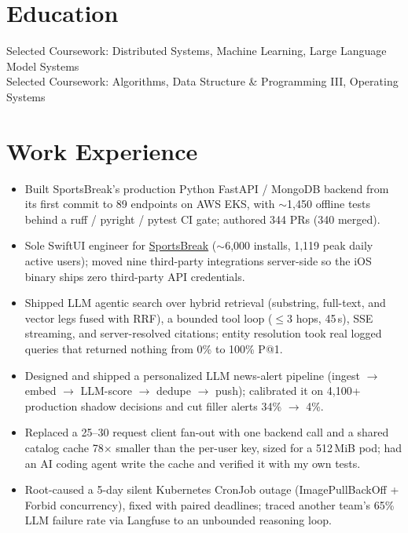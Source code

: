 \documentclass[11pt, letterpaper]{article}
\begin{document}

\section{Education}
Selected Coursework: Distributed Systems, Machine Learning, Large Language Model Systems\\[1pt]
Selected Coursework: Algorithms, Data Structure \& Programming III, Operating Systems

\section{Work Experience}
\begin{itemize}
  \item Built SportsBreak's production Python FastAPI / MongoDB backend from its first commit to 89 endpoints on AWS EKS, with $\sim$1{,}450 offline tests behind a ruff / pyright / pytest CI gate; authored 344 PRs (340 merged).
  \item Sole SwiftUI engineer for \href{https://apps.apple.com/app/id6762649287}{SportsBreak} ($\sim$6{,}000 installs, 1{,}119 peak daily active users); moved nine third-party integrations server-side so the iOS binary ships zero third-party API credentials.
  \item Shipped LLM agentic search over hybrid retrieval (substring, full-text, and vector legs fused with RRF), a bounded tool loop ($\le$3 hops, 45\,s), SSE streaming, and server-resolved citations; entity resolution took real logged queries that returned nothing from 0\% to 100\% P@1.
  \item Designed and shipped a personalized LLM news-alert pipeline (ingest $\to$ embed $\to$ LLM-score $\to$ dedupe $\to$ push); calibrated it on 4{,}100+ production shadow decisions and cut filler alerts 34\% $\to$ 4\%.
  \item Replaced a 25--30 request client fan-out with one backend call and a shared catalog cache 78$\times$ smaller than the per-user key, sized for a 512\,MiB pod; had an AI coding agent write the cache and verified it with my own tests.
  \item Root-caused a 5-day silent Kubernetes CronJob outage (ImagePullBackOff + Forbid concurrency), fixed with paired deadlines; traced another team's 65\% LLM failure rate via Langfuse to an unbounded reasoning loop.
\end{itemize}
\end{document}
